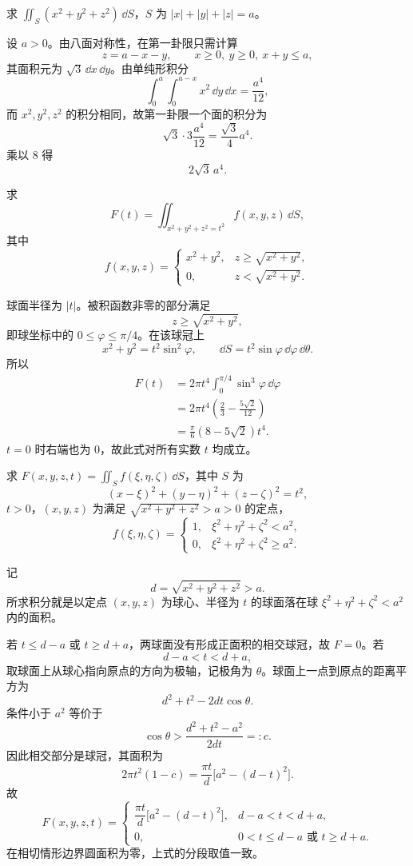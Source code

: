 \begin{xexercise}[6]
求 $\iint_S(x^2+y^2+z^2)\,\dd S$，$S$ 为 $|x|+|y|+|z|=a$。
\end{xexercise}
\begin{xsolution}
设 $a>0$。由八面对称性，在第一卦限只需计算
\[
  z=a-x-y,\qquad x\ge0,\ y\ge0,\ x+y\le a,
\]
其面积元为 $\sqrt3\,\dd x\,\dd y$。由单纯形积分
\[
  \int_0^a\int_0^{a-x}x^2\,\dd y\,\dd x
  =\frac{a^4}{12},
\]
而 $x^2,y^2,z^2$ 的积分相同，故第一卦限一个面的积分为
\[
  \sqrt3\cdot3\frac{a^4}{12}=\frac{\sqrt3}{4}a^4.
\]
乘以 $8$ 得
\[
  \boxed{2\sqrt3\,a^4}.
\]
\end{xsolution}


\begin{xexercise}[7]
求
\[
  F(t)=\iint_{x^2+y^2+z^2=t^2}f(x,y,z)\,\dd S,
\]
其中
\[
  f(x,y,z)=
  \begin{cases}
    x^2+y^2,& z\ge\sqrt{x^2+y^2},\\
    0,& z<\sqrt{x^2+y^2}.
  \end{cases}
\]
\end{xexercise}
\begin{xsolution}
球面半径为 $|t|$。被积函数非零的部分满足
\[
  z\ge\sqrt{x^2+y^2},
\]
即球坐标中的 $0\le\varphi\le\pi/4$。在该球冠上
\[
  x^2+y^2=t^2\sin^2\varphi,\qquad
  \dd S=t^2\sin\varphi\,\dd\varphi\,\dd\theta.
\]
所以
\begin{align*}
F(t)
&=2\pi t^4\int_0^{\pi/4}\sin^3\varphi\,\dd\varphi\\
&=2\pi t^4\left(\frac23-\frac{5\sqrt2}{12}\right)\\
&=\frac{\pi}{6}(8-5\sqrt2)t^4.
\end{align*}
$t=0$ 时右端也为 $0$，故此式对所有实数 $t$ 均成立。
\end{xsolution}


\begin{xexercise}[8]
求 $F(x,y,z,t)=\iint_S f(\xi,\eta,\zeta)\,\dd S$，其中 $S$ 为
\[
  (x-\xi)^2+(y-\eta)^2+(z-\zeta)^2=t^2,
\]
$t>0$，$(x,y,z)$ 为满足 $\sqrt{x^2+y^2+z^2}>a>0$ 的定点，
\[
  f(\xi,\eta,\zeta)=
  \begin{cases}
  1,& \xi^2+\eta^2+\zeta^2<a^2,\\
  0,& \xi^2+\eta^2+\zeta^2\ge a^2.
  \end{cases}
\]
\end{xexercise}
\begin{xsolution}
记
\[
  d=\sqrt{x^2+y^2+z^2}>a.
\]
所求积分就是以定点 $(x,y,z)$ 为球心、半径为 $t$ 的球面落在球 $\xi^2+\eta^2+\zeta^2<a^2$ 内的面积。

若 $t\le d-a$ 或 $t\ge d+a$，两球面没有形成正面积的相交球冠，故 $F=0$。若
\[
  d-a<t<d+a,
\]
取球面上从球心指向原点的方向为极轴，记极角为 $\theta$。球面上一点到原点的距离平方为
\[
  d^2+t^2-2dt\cos\theta.
\]
条件小于 $a^2$ 等价于
\[
  \cos\theta>\frac{d^2+t^2-a^2}{2dt}=:c.
\]
因此相交部分是球冠，其面积为
\[
  2\pi t^2(1-c)
  =\frac{\pi t}{d}\bigl[a^2-(d-t)^2\bigr].
\]
故
\[
F(x,y,z,t)=
\begin{cases}
\dfrac{\pi t}{d}\bigl[a^2-(d-t)^2\bigr],&d-a<t<d+a,\\[5pt]
0,&0<t\le d-a\text{ 或 }t\ge d+a.
\end{cases}
\]
在相切情形边界圆面积为零，上式的分段取值一致。
\end{xsolution}


